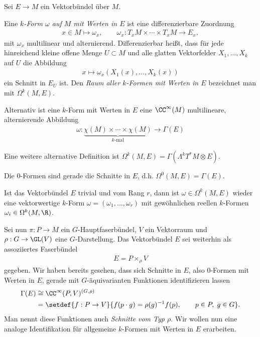 \documentclass[%
	paper=a5,%
	fleqn,%
	DIV=18,%
	BCOR=0mm,
	fontsize=11pt,
	titlepage=false,%
	bibliography=totoc,
	DIV=18,%
	twoside=true,
	pdftitle=Riemannsche Geometrie,
	pdfauthor=Uwe Semmelmann,
	numbers=noendperiod]%
	{scrbook}
\begin{document}
Sei $E\to M$ ein Vektorbündel über $M$.

\begin{defn}
Eine \emph{$k$-Form $\omega$ auf $M$ mit Werten in $E$} ist eine
differenzierbare Zuordnung
\begin{align*}
x\in M\mapsto \omega_x,\qquad \omega_x : T_xM\times\cdots \times T_xM\to E_x,
\end{align*}
mit $\omega_x$ multilinear und alternierend. Differenzierbar heißt, dass für jede hinreichend kleine offene Menge
$U\subset M$ und alle glatten Vektorfelder $X_1,\ldots,X_k$ auf $U$ die
Abbildung
\begin{align*}
x\mapsto \omega_x(X_1(x),\ldots,X_k(x))
\end{align*}
ein Schnitt in $E_{U}$ ist. Den \emph{Raum aller $k$-Formen mit Werten in $E$}
bezeichnet man mit $\Omega^k(M,E)$.\fish
\end{defn}

\begin{rem}[Bemerkungen.]
\begin{remenum}
\item
Alternativ ist eine $k$-Form mit Werten in $E$ eine $\CC^\infty(M)$
multilineare, alternierende Abbildung
\begin{align*}
\omega: \underbrace{\chi(M)\times \cdots \times \chi(M)}_{k\text{-mal}}\to
\Gamma(E)
\end{align*}
\item Eine weitere alternative Definition ist $\Omega^k(M,E)
=\Gamma(\Lambda^kT^*M\otimes E)$.
\item Die $0$-Formen sind gerade die Schnitte in $E$, d.h. $\Omega^0(M,E) =
\Gamma(E)$.
\item Ist das Vektorbündel $E$ trivial und vom Rang $r$, dann ist
$\omega\in\Omega^k(M,E)$ wieder eine vektorwertige $k$-Form $\omega =
(\omega_1,\ldots,\omega_r)$ mit gewöhnlichen reellen $k$-Formen
$\omega_i\in\Omega^k(M,\R)$.\map
\end{remenum}
\end{rem}

Sei nun $\pi: P\to M$ ein $G$-Hauptfaserbündel, $V$ ein Vektorraum und $\rho:
G\to \GL(V)$ eine $G$-Darstellung. Das Vektorbündel $E$ sei weiterhin als
assoziiertes Faserbündel
\begin{align*}
E = P\times_\rho V
\end{align*}
gegeben. Wir haben bereits gesehen, dass sich Schnitte in $E$, also $0$-Formen
mit Werten in $E$, gerade mit $G$-äquivarianten Funktionen identifizieren lassen
\begin{align*}
\Gamma(E) &\cong \CC^\infty(P,V)^{(G,\rho)}\\
&= \setdef{f: P\to V}{f(p\cdot g) = \rho(g)^{-1}f(p),\qquad p\in P,\; g\in G}.
\end{align*}
Man nennt diese Funktionen auch \emph{Schnitte vom Typ $\rho$}.
Wir wollen nun eine analoge Identifikation für allgemeine $k$-Formen mit Werten
in $E$ erarbeiten.
\end{document}
